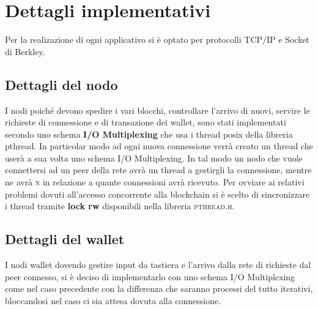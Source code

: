 \documentclass[a4paper,10pt]{report}
\begin{document}
  \chapter{Dettagli implementativi}
	Per la realizazione di ogni applicativo si è optato per protocolli TCP/IP e Socket di Berkley.
    \section{Dettagli del nodo}\noindent
	I nodi poiché devono spedire i vari blocchi, controllare l'arrivo di nuovi, servire le richieste di connessione e di transazione dei wallet, sono stati implementati secondo uno schema \textbf{I/O Multiplexing} che usa i thread posix della libreria pthread. In particolar modo ad ogni nuova connessione verrà creato un thread che userà a sua volta uno schema I/O Multiplexing. In tal modo un nodo che vuole connettersi ad un peer della rete avrà un thread a gestirgli la connessione, mentre ne avrà \textsc{n} in relazione a quante connessioni avrà ricevuto.\newline
	Per ovviare ai relativi problemi dovuti all’accesso concorrente alla blockchain si è scelto di sincronizzare i thread tramite \textbf{lock rw} disponibili nella libreria \textsc{pthread.h}.

    \section{Dettagli del wallet}\noindent

 I nodi wallet dovendo gestire input da tastiera e l'arrivo dalla rete di richieste dal peer connesso, si è deciso di implementarlo con uno schema I/O Multiplexing come nel caso precedente con la differenza che saranno processi del tutto iterativi, bloccandosi nel caso ci sia attesa dovuta alla connessione.
\end{document}
